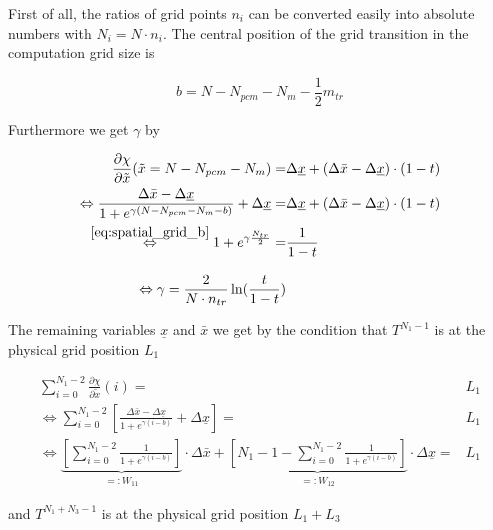 \documentclass{scrartcl}[12pt, halfparskip]
\numberwithin{equation}{section}
\numberwithin{figure}{section}
\numberwithin{table}{section}
\begin{document}
First of all, the ratios of grid points $n_i$ can be converted easily into absolute numbers with $N_i = N \cdot n_i$. The central position of the grid transition in the computation grid size is

\begin{equation}
	b = N - N_{pcm} - N_m - \frac{1}{2} m_{tr}
	\label{eq:spatial_grid_b}
\end{equation}

Furthermore we get $\gamma$ by

\begin{subequations}
\begin{align}
	\frac{\partial \chi}{\partial \tilde{x}}(\tilde{x}=N-N_{pcm}-N_m) = & \Delta \underline{x} + (\Delta \bar{x} - \Delta \underline{x}) \cdot (1-t) \\
	\Leftrightarrow \frac{\Delta \bar{x} - \Delta \underline{x}}{1 + e^{\gamma(N-N_{pcm}-N_m - b)}} + \Delta \underline{x} = & \Delta \underline{x} + (\Delta \bar{x} - \Delta \underline{x}) \cdot (1-t)  \\
	\stackrel{\eqref{eq:spatial_grid_b}}{\Leftrightarrow}  1 + e^{\gamma \frac{N_{tr}}{2}} = & \frac{1}{1 - t}  \\[2ex]
	\Leftrightarrow \gamma = \frac{2}{N \cdot n_{tr}} \ln(\frac{t}{1-t})
\end{align}
\end{subequations}

The remaining variables $\underline{x}$ and $\bar{x}$ we get by the condition that $T^{N_1-1}$ is at the physical grid position $L_1$

\begin{subequations}
	\begin{align}
	\sum_{i=0}^{N_1 - 2} \frac{\partial \chi}{\partial \tilde{x}}(i) = & L_1 \\
	\Leftrightarrow \sum_{i=0}^{N_1 - 2} \left[ \frac{\Delta \bar{x} - \Delta \underline{x}}{1 + e^{\gamma(i - b)}} + \Delta \underline{x} \right] = & L_1 \\
	\Leftrightarrow \underbrace{ \left[ \sum_{i=0}^{N_1 - 2} \frac{1}{1 + e^{\gamma(i - b)}} \right] }_{=: W_{11}} \cdot \Delta \bar{x} + \underbrace{\left[ N_1 - 1 - \sum_{i=0}^{N_1 - 2} \frac{1}{1 + e^{\gamma(i - b)}} \right]}_{=: W_{12}} \cdot \Delta \underline{x} = & L_1
	\end{align}
\end{subequations}

and $T^{N_1+N_3-1}$ is at the physical grid position $L_1+L_3$
\end{document}

